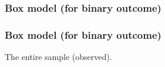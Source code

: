 \documentclass[handout]{beamer}
\begin{document}
   \begin{frame}
   \frametitle{Box model (for binary outcome)}
   \begin{center}
   \end{center}

   \end{frame}



   \begin{frame}
   \frametitle{Box model (for binary outcome)}
   \begin{center}
   \end{center}
   The entire sample (observed).
   \end{frame}

\end{document}

